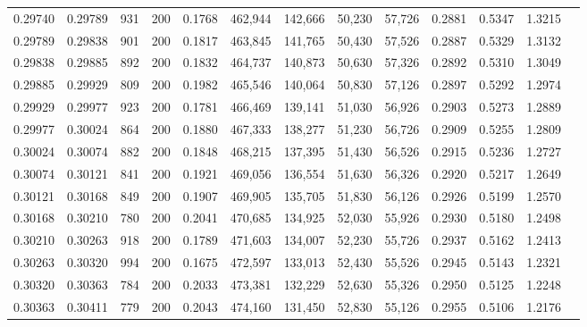 \begin{tabular}{rrrrrrrrrrrrr}
0.29740 & 0.29789 &   931 & 200 &                                     0.1768 & 462,944 & 142,666 &  50,230 &  57,726 & 0.2881 & 0.5347 & 1.3215 \\
0.29789 & 0.29838 &   901 & 200 &                                     0.1817 & 463,845 & 141,765 &  50,430 &  57,526 & 0.2887 & 0.5329 & 1.3132 \\
0.29838 & 0.29885 &   892 & 200 &                                     0.1832 & 464,737 & 140,873 &  50,630 &  57,326 & 0.2892 & 0.5310 & 1.3049 \\
0.29885 & 0.29929 &   809 & 200 &                                     0.1982 & 465,546 & 140,064 &  50,830 &  57,126 & 0.2897 & 0.5292 & 1.2974 \\
0.29929 & 0.29977 &   923 & 200 &                                     0.1781 & 466,469 & 139,141 &  51,030 &  56,926 & 0.2903 & 0.5273 & 1.2889 \\
0.29977 & 0.30024 &   864 & 200 &                                     0.1880 & 467,333 & 138,277 &  51,230 &  56,726 & 0.2909 & 0.5255 & 1.2809 \\
0.30024 & 0.30074 &   882 & 200 &                                     0.1848 & 468,215 & 137,395 &  51,430 &  56,526 & 0.2915 & 0.5236 & 1.2727 \\
0.30074 & 0.30121 &   841 & 200 &                                     0.1921 & 469,056 & 136,554 &  51,630 &  56,326 & 0.2920 & 0.5217 & 1.2649 \\
0.30121 & 0.30168 &   849 & 200 &                                     0.1907 & 469,905 & 135,705 &  51,830 &  56,126 & 0.2926 & 0.5199 & 1.2570 \\
0.30168 & 0.30210 &   780 & 200 &                                     0.2041 & 470,685 & 134,925 &  52,030 &  55,926 & 0.2930 & 0.5180 & 1.2498 \\
0.30210 & 0.30263 &   918 & 200 &                                     0.1789 & 471,603 & 134,007 &  52,230 &  55,726 & 0.2937 & 0.5162 & 1.2413 \\
0.30263 & 0.30320 &   994 & 200 &                                     0.1675 & 472,597 & 133,013 &  52,430 &  55,526 & 0.2945 & 0.5143 & 1.2321 \\
0.30320 & 0.30363 &   784 & 200 &                                     0.2033 & 473,381 & 132,229 &  52,630 &  55,326 & 0.2950 & 0.5125 & 1.2248 \\
0.30363 & 0.30411 &   779 & 200 &                                     0.2043 & 474,160 & 131,450 &  52,830 &  55,126 & 0.2955 & 0.5106 & 1.2176 \\

\end{tabular}
